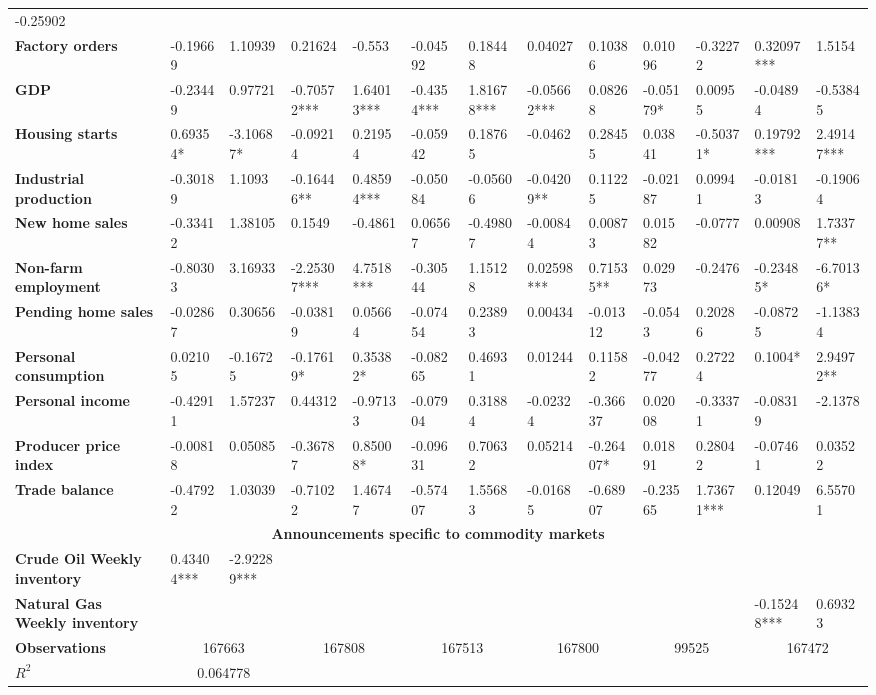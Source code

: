 \begin{sidewaystable}
{\begin{tabular}{@{}lllllllllllll@{}}
-0.25902 \\ \textbf{Factory orders}& -0.19669 & 1.10939 & 0.21624 & -0.553 & -0.04592 & 0.18448 & 0.04027 & 0.10386 & 0.01096 & -0.32272 & 0.32097*** & 1.5154 \\ \textbf{GDP}& -0.23449 & 0.97721 & -0.70572*** & 1.64013*** & -0.4354*** & 1.81678*** & -0.05662*** & 0.08268 & -0.05179* & 0.00955 & -0.04894 & -0.53845 \\ \textbf{Housing starts}& 0.69354*& -3.10687*& -0.09214 & 0.21954 & -0.05942 & 0.18765 & -0.0462 & 0.28455 & 0.03841 & -0.50371* & 0.19792*** & 2.49147*** \\ \textbf{Industrial production}& -0.30189 & 1.1093 & -0.16446**& 0.48594***& -0.05084 & -0.05606 & -0.04209** & 0.11225 & -0.02187 & 0.09941 & -0.01813 & -0.19064 \\ \textbf{New home sales}& -0.33412 & 1.38105 & 0.1549 & -0.4861 & 0.06567 & -0.49807 & -0.00844 & 0.00873 & 0.01582 & -0.0777 & 0.00908 & 1.73377** \\ \textbf{Non-farm employment}& -0.80303 & 3.16933 & -2.25307*** & 4.7518*** & -0.30544 & 1.15128 & 0.02598*** & 0.71535** & 0.02973 & -0.2476 & -0.23485* & -6.70136* \\ \textbf{Pending home sales}& -0.02867 & 0.30656 & -0.03819 & 0.05664 & -0.07454 & 0.23893 & 0.00434 & -0.01312 & -0.0543 & 0.20286 & -0.08725 & -1.13834 \\ \textbf{Personal consumption}& 0.02105 & -0.16725 & -0.17619* & 0.35382* & -0.08265 & 0.46931 & 0.01244 & 0.11582 & -0.04277 & 0.27224 & 0.1004* & 2.94972** \\ \textbf{Personal income}& -0.42911 & 1.57237 & 0.44312 & -0.97133 & -0.07904 & 0.31884 & -0.02324 & -0.36637 & 0.02008 & -0.33371 & -0.08319 & -2.1378 \\ \textbf{Producer price index}& -0.00818 & 0.05085 & -0.36787 & 0.85008* & -0.09631 & 0.70632 & 0.05214 & -0.26407* & 0.01891 & 0.28042 & -0.07461 & 0.03522 \\ \textbf{Trade balance}& -0.47922 & 1.03039 & -0.71022 & 1.46747 & -0.57407 & 1.55683 & -0.01685 & -0.68907 & -0.23565 & 1.73671*** & 0.12049 & 6.55701 \\  \midrule \multicolumn{13}{c}{\textbf{Announcements specific to commodity markets}} \\ \midrule \textbf{Crude Oil Weekly inventory}& 0.43404*** & -2.92289*** &  &  &  &  &  &  &  &  &  &  \\ \textbf{Natural Gas Weekly inventory}&  &  &  &  &  &  &  &  &  &  & -0.15248*** & 0.69323 \\  \midrule \textbf{Observations}             &\multicolumn{2}{c}{ 167663 }                                                 & \multicolumn{2}{c}{ 167808 }                                                 & \multicolumn{2}{c}{ 167513 }                                                 & \multicolumn{2}{c}{ 167800 }                                                 & \multicolumn{2}{c}{ 99525 }                                                   & \multicolumn{2}{c}{ 167472 }                                                 \\ \textbf{$R^2$}             &\multicolumn{2}{c}{ 0.064778 }                      
\end{tabular}}
\end{sidewaystable}
